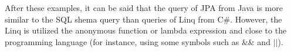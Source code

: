 \documentclass[10pt]{report}
\begin{document}
After these examples, it can be said that the query of JPA from Java is more similar to the SQL shema query than queries of Linq from C\#. However, the Linq is utilized the anonymous function or lambda expression and close to the programming language (for instance, using some symbols such as \&\& and $||$).

\end{document}
